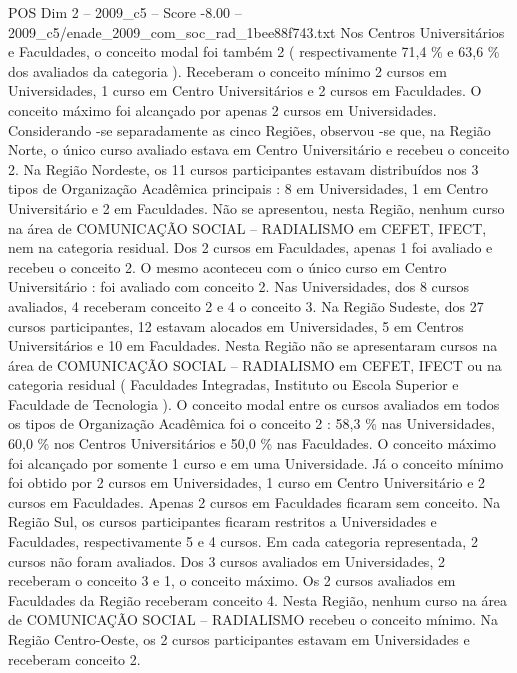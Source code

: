 \begin{textsample}{POS Dim 2 – 2009\_c5 – Score -8.00 – 2009\_c5/enade\_2009\_com\_soc\_rad\_1bee88f743.txt}
Nos Centros Universitários e Faculdades, o conceito modal foi também 2 ( respectivamente 71,4 \% e 63,6 \% dos avaliados da categoria ).
Receberam o conceito mínimo 2 cursos em Universidades, 1 curso em Centro Universitários e 2 cursos em Faculdades.
O conceito máximo foi alcançado por apenas 2 cursos em Universidades.
Considerando -se separadamente as cinco Regiões, observou -se que, na Região Norte, o único curso avaliado estava em Centro Universitário e recebeu o conceito 2.
Na Região Nordeste, os 11 cursos participantes estavam distribuídos nos 3 tipos de Organização Acadêmica principais : 8 em Universidades, 1 em Centro Universitário e 2 em Faculdades.
Não se apresentou, nesta Região, nenhum curso na área de COMUNICAÇÃO SOCIAL – RADIALISMO em CEFET, IFECT, nem na categoria residual.
Dos 2 cursos em Faculdades, apenas 1 foi avaliado e recebeu o conceito 2.
O mesmo aconteceu com o único curso em Centro Universitário : foi avaliado com conceito 2.
Nas Universidades, dos 8 cursos avaliados, 4 receberam conceito 2 e 4 o conceito 3.
Na Região Sudeste, dos 27 cursos participantes, 12 estavam alocados em Universidades, 5 em Centros Universitários e 10 em Faculdades.
Nesta Região não se apresentaram cursos na área de COMUNICAÇÃO SOCIAL – RADIALISMO em CEFET, IFECT ou na categoria residual ( Faculdades Integradas, Instituto ou Escola Superior e Faculdade de Tecnologia ).
O conceito modal entre os cursos avaliados em todos os tipos de Organização Acadêmica foi o conceito 2 : 58,3 \% nas Universidades, 60,0 \% nos Centros Universitários e 50,0 \% nas Faculdades.
O conceito máximo foi alcançado por somente 1 curso e em uma Universidade.
Já o conceito mínimo foi obtido por 2 cursos em Universidades, 1 curso em Centro Universitário e 2 cursos em Faculdades.
Apenas 2 cursos em Faculdades ficaram sem conceito.
Na Região Sul, os cursos participantes ficaram restritos a Universidades e Faculdades, respectivamente 5 e 4 cursos.
Em cada categoria representada, 2 cursos não foram avaliados.
Dos 3 cursos avaliados em Universidades, 2 receberam o conceito 3 e 1, o conceito máximo.
Os 2 cursos avaliados em Faculdades da Região receberam conceito 4.
Nesta Região, nenhum curso na área de COMUNICAÇÃO SOCIAL – RADIALISMO recebeu o conceito mínimo.
Na Região Centro-Oeste, os 2 cursos participantes estavam em Universidades e receberam conceito 2.

\end{textsample}
